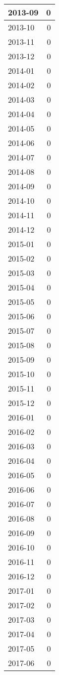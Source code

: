 \documentclass[
]{article}
\begin{document}
\begin{table}[H]
\begin{tabular}{l|r}
\hline
2013-09 & 0\\
\hline
2013-10 & 0\\
\hline
2013-11 & 0\\
\hline
2013-12 & 0\\
\hline
2014-01 & 0\\
\hline
2014-02 & 0\\
\hline
2014-03 & 0\\
\hline
2014-04 & 0\\
\hline
2014-05 & 0\\
\hline
2014-06 & 0\\
\hline
2014-07 & 0\\
\hline
2014-08 & 0\\
\hline
2014-09 & 0\\
\hline
2014-10 & 0\\
\hline
2014-11 & 0\\
\hline
2014-12 & 0\\
\hline
2015-01 & 0\\
\hline
2015-02 & 0\\
\hline
2015-03 & 0\\
\hline
2015-04 & 0\\
\hline
2015-05 & 0\\
\hline
2015-06 & 0\\
\hline
2015-07 & 0\\
\hline
2015-08 & 0\\
\hline
2015-09 & 0\\
\hline
2015-10 & 0\\
\hline
2015-11 & 0\\
\hline
2015-12 & 0\\
\hline
2016-01 & 0\\
\hline
2016-02 & 0\\
\hline
2016-03 & 0\\
\hline
2016-04 & 0\\
\hline
2016-05 & 0\\
\hline
2016-06 & 0\\
\hline
2016-07 & 0\\
\hline
2016-08 & 0\\
\hline
2016-09 & 0\\
\hline
2016-10 & 0\\
\hline
2016-11 & 0\\
\hline
2016-12 & 0\\
\hline
2017-01 & 0\\
\hline
2017-02 & 0\\
\hline
2017-03 & 0\\
\hline
2017-04 & 0\\
\hline
2017-05 & 0\\
\hline
2017-06 & 0\\
\hline
\end{tabular}
\end{table}
\end{document}
